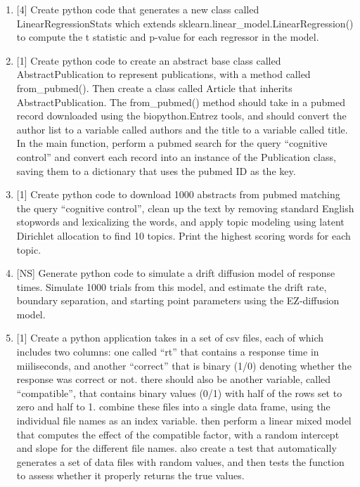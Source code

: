 \documentclass[
]{article}
\begin{document}
\begin{enumerate}
\def\labelenumi{\arabic{enumi}.}
\item
  {[}4{]} Create python code that generates a new class called
  LinearRegressionStats which extends
  sklearn.linear\_model.LinearRegression() to compute the t statistic
  and p-value for each regressor in the model.
\item
  {[}1{]} Create python code to create an abstract base class called
  AbstractPublication to represent publications, with a method called
  from\_pubmed(). Then create a class called Article that inherits
  AbstractPublication. The from\_pubmed() method should take in a pubmed
  record downloaded using the biopython.Entrez tools, and should convert
  the author list to a variable called authors and the title to a
  variable called title. In the main function, perform a pubmed search
  for the query ``cognitive control'' and convert each record into an
  instance of the Publication class, saving them to a dictionary that
  uses the pubmed ID as the key.
\item
  {[}1{]} Create python code to download 1000 abstracts from pubmed
  matching the query ``cognitive control'', clean up the text by
  removing standard English stopwords and lexicalizing the words, and
  apply topic modeling using latent Dirichlet allocation to find 10
  topics. Print the highest scoring words for each topic.
\item
  {[}NS{]} Generate python code to simulate a drift diffusion model of
  response times. Simulate 1000 trials from this model, and estimate the
  drift rate, boundary separation, and starting point parameters using
  the EZ-diffusion model.
\item
  {[}1{]} Create a python application takes in a set of csv files, each
  of which includes two columns: one called ``rt'' that contains a
  response time in miiliseconds, and another ``correct'' that is binary
  (1/0) denoting whether the response was correct or not. there should
  also be another variable, called ``compatible'', that contains binary
  values (0/1) with half of the rows set to zero and half to 1. combine
  these files into a single data frame, using the individual file names
  as an index variable. then perform a linear mixed model that computes
  the effect of the compatible factor, with a random intercept and slope
  for the different file names. also create a test that automatically
  generates a set of data files with random values, and then tests the
  function to assess whether it properly returns the true values.

\end{enumerate}
\end{document}
